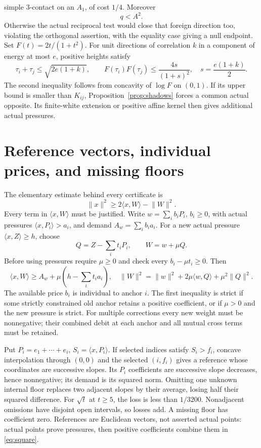 \documentclass[11pt]{article}
\theoremstyle{definition}
\theoremstyle{remark}
\newcommand{\ip}[2]{\langle #1,#2\rangle}
\newcommand{\norm}[1]{\lVert #1\rVert}
\begin{document}
simple \(3\)-contact on an \(A_1\), of cost \(1/4\).
Moreover
\begin{equation}\label{eq:foreigncost}
 q<A^2.
\end{equation}
Otherwise the actual reciprocal test would close that foreign
direction too, violating the orthogonal assertion, with the
equality case giving a null endpoint.
Set \(F(t)=2t/(1+t^2)\). For unit directions of correlation \(k\)
in a component of energy at most \(e\), positive heights satisfy
\begin{equation}\label{eq:pairupper}
 \tau_i+\tau_j\leq\sqrt{2e(1+k)},\qquad
 F(\tau_i)F(\tau_j)\leq\frac{4s}{(1+s)^2},\quad
 s=\frac{e(1+k)}2.
\end{equation}
The second inequality follows from concavity of \(\log F\) on
\((0,1)\). If its upper bound is smaller than \(K_{ij}\),
Proposition~\ref{prop:shadows} forces a common actual opposite.
Its finite-white extension or positive affine kernel then gives
additional actual pressures.

\section{Reference vectors, individual prices, and missing floors}
\label{sec:references}
The elementary estimate behind every certificate is
\begin{equation}
\label{eq:square}
 \norm{x}^2\geq2\ip{x}{W}-\norm{W}^2.
\end{equation}
Every term in \(\ip{x}{W}\) must be justified.
Write \(w=\sum_i b_iP_i\), \(b_i\geq0\), with actual pressures
\(\ip{x}{P_i}>a_i\), and demand \(A_w=\sum_i b_i a_i\).
For a new actual pressure \(\ip{x}{Z}\geq h\), choose
\[
 Q=Z-\sum_i t_iP_i,\qquad W=w+\mu Q.
\]
Before using pressures require \(\mu\geq0\) and check every
\(b_i-\mu t_i\geq0\).
Then
\begin{equation}
\label{eq:payment}
 \ip{x}{W}\geq A_w+\mu(h-\sum_i t_i a_i),\quad
 \norm{W}^2=\norm{w}^2+2\mu\ip{w}{Q}+\mu^2\norm{Q}^2.
\end{equation}
The available price \(b_i\) is individual to anchor \(i\).
The first inequality is strict if some strictly constrained old
anchor retains a positive coefficient, or if \(\mu>0\) and the
new pressure is strict. For multiple corrections every new weight
must be nonnegative; their combined debit at each anchor and all
mutual cross terms must be retained.

Put \(P_i=e_1+\cdots+e_i\), \(S_i=\ip{x}{P_i}\).
If selected indices satisfy \(S_i>f_i\), concave interpolation
through \((0,0)\) and the selected \((i,f_i)\) gives a reference
whose coordinates are successive slopes. Its \(P_i\) coefficients
are successive slope decreases, hence nonnegative; its demand
is its squared norm. Omitting one unknown internal floor replaces
two adjacent slopes by their average, losing half their squared
difference. For \(\sqrt t\) at \(t\geq5\), the loss is less than
\(1/3200\). Nonadjacent omissions have disjoint open intervals,
so losses add. A missing floor has coefficient zero.
References are Euclidean vectors, not asserted actual points:
actual points prove pressures, then positive coefficients combine
them in \eqref{eq:square}.
\end{document}
